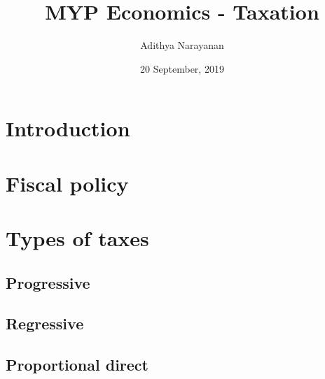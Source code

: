 \documentclass[12pt, a4]{article}
\title{MYP Economics - Taxation}
\author{Adithya Narayanan}
\date{20 September, 2019}
\begin{document}
	\begin{titlepage}
		\maketitle
	\end{titlepage}
	\tableofcontents
	\newpage
	\section{Introduction}
		\par
	\section{Fiscal policy}
	
	\section{Types of taxes}
		\subsection{Progressive}
			
		\subsection{Regressive}
			
		\subsection{Proportional direct}
			
\end{document}
